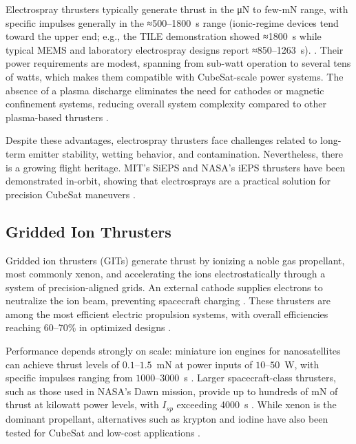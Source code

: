 Electrospray thrusters typically generate thrust in the μN to few-mN range, with specific impulses generally in the ≈500–1800~s range (ionic-regime devices tend toward the upper end; e.g., the TILE demonstration showed ≈1800~s while typical MEMS and laboratory electrospray designs report ≈850–1263~s). \cite{alnaqbi-propulsion_summary,tummala-propulsion_summary,lozano-smallspacecraft_summary}. Their power requirements are modest, spanning from sub-watt operation to several tens of watts, which makes them compatible with CubeSat-scale power systems. The absence of a plasma discharge eliminates the need for cathodes or magnetic confinement systems, reducing overall system complexity compared to other plasma-based thrusters \cite{lozano-smallspacecraft_summary}.

Despite these advantages, electrospray thrusters face challenges related to long-term emitter stability, wetting behavior, and contamination. Nevertheless, there is a growing flight heritage. MIT’s SiEPS and NASA’s iEPS thrusters have been demonstrated in-orbit, showing that electrosprays are a practical solution for precision CubeSat maneuvers \cite{alnaqbi-propulsion_summary}.

\subsection{Gridded Ion Thrusters}

Gridded ion thrusters (GITs) generate thrust by ionizing a noble gas propellant, most commonly xenon, and accelerating the ions electrostatically through a system of precision-aligned grids. An external cathode supplies electrons to neutralize the ion beam, preventing spacecraft charging \cite{feep-plasma-propulsion}. These thrusters are among the most efficient electric propulsion systems, with overall efficiencies reaching 60–70\% in optimized designs \cite{fundamentals-of-electric-propulsion}.

Performance depends strongly on scale: miniature ion engines for nanosatellites can achieve thrust levels of $0.1$–$1.5$~mN at power inputs of $10$–$50$~W, with specific impulses ranging from $1000$–$3000$~s \cite{tummala-propulsion_summary}. Larger spacecraft-class thrusters, such as those used in NASA’s Dawn mission, provide up to hundreds of mN of thrust at kilowatt power levels, with $I_{sp}$ exceeding 4000~s \cite{bpt-4000}. While xenon is the dominant propellant, alternatives such as krypton and iodine have also been tested for CubeSat and low-cost applications \cite{lozano-smallspacecraft_summary}. 

